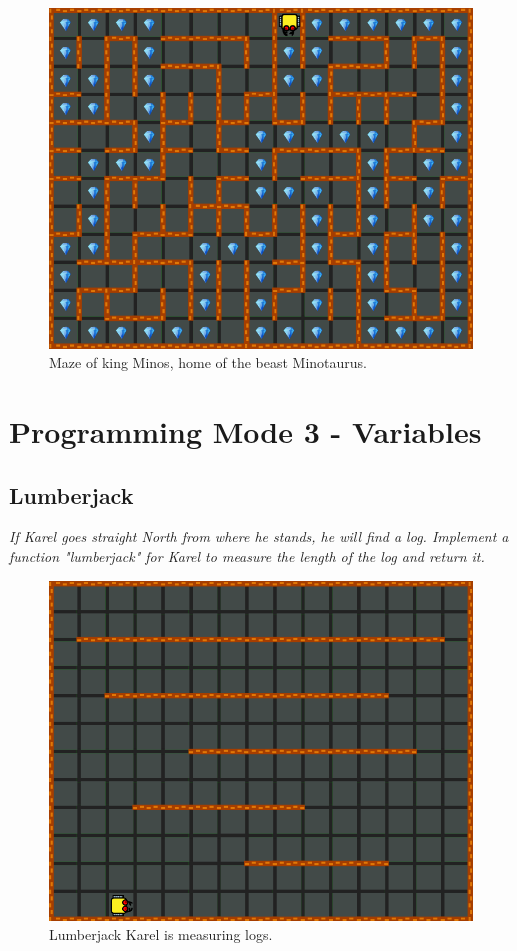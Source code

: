 \begin{figure}[!ht]
\begin{center}
\includegraphics[height=0.4\textwidth]{img/f14.png}
\end{center}
\vspace{-4mm}
\caption{Maze of king Minos, home of the beast Minotaurus.}
\label{fig:f14}
\end{figure}


\newpage

\section{Programming Mode 3 - Variables}

\subsection{Lumberjack}

{\em If Karel goes straight North from where he stands, he will find a log. Implement a function "lumberjack" for Karel to measure the length of the log and return it.}\\[-7mm]


\begin{figure}[!ht]
\begin{center}
\includegraphics[height=0.4\textwidth]{img/h01.png}
\end{center}
\vspace{-4mm}
\caption{Lumberjack Karel is measuring logs.}
\vspace{-1cm}
\label{fig:h01}
\end{figure}


